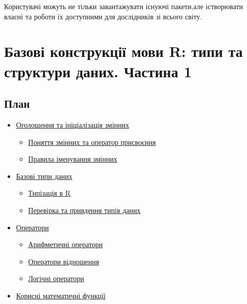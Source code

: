 \documentclass[
]{book}
\providecommand{\tightlist}{%
  \setlength{\itemsep}{0pt}\setlength{\parskip}{0pt}}
\begin{document}
Користувачі можуть не тільки завантажувати існуючі пакети,але істворювати власні та роботи їх доступними для дослідників зі всього світу.

\hypertarget{chapter2}{%
\chapter{Базові конструкції мови R: типи та структури даних. Частина 1}\label{chapter2}}

\hypertarget{ux43fux43bux430ux43d-1}{%
\section*{План}\label{ux43fux43bux430ux43d-1}}

\begin{itemize}
\tightlist
\item
  \protect\hyperlink{chapter21}{Оголошення та ініціалізація змінних}

  \begin{itemize}
  \tightlist
  \item
    \protect\hyperlink{chapter211}{Поняття змінних та оператор присвоєння}
  \item
    \protect\hyperlink{chapter212}{Правила іменування змінних}
  \end{itemize}
\item
  \protect\hyperlink{chapter22}{Базові типи даних}

  \begin{itemize}
  \tightlist
  \item
    \protect\hyperlink{chapter221}{Типізація в R}
  \item
    \protect\hyperlink{chapter222}{Перевірка та привдення типів даних}
  \end{itemize}
\item
  \protect\hyperlink{chapter23}{Оператори}

  \begin{itemize}
  \tightlist
  \item
    \protect\hyperlink{chapter231}{Арифметичні оператори}
  \item
    \protect\hyperlink{chapter232}{Оператори відношення}
  \item
    \protect\hyperlink{chapter233}{Логічні оператори}
  \end{itemize}
\item
  \protect\hyperlink{chapter24}{Корисні математичні функції}


\end{itemize}
\end{document}
